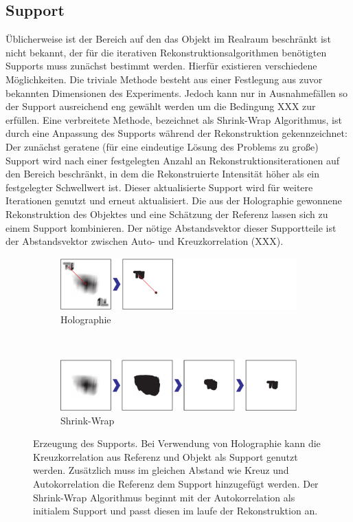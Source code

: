 \subsection{Support}
Üblicherweise ist der Bereich auf den das Objekt im Realraum beschränkt ist nicht bekannt, der für die iterativen Rekonstruktionsalgorithmen benötigten Supports muss zunächst bestimmt werden. Hierfür existieren verschiedene Möglichkeiten. Die triviale Methode besteht aus einer Festlegung aus zuvor bekannten Dimensionen des Experiments. Jedoch kann nur in Ausnahmefällen so der Support ausreichend eng gewählt werden um die Bedingung XXX zur erfüllen.
Eine verbreitete Methode, bezeichnet als Shrink-Wrap Algorithmus, ist durch eine Anpassung des Supports während der Rekonstruktion gekennzeichnet: Der zunächst geratene (für eine eindeutige Lösung des Problems  zu große) Support wird nach einer festgelegten Anzahl an Rekonstruktionsiterationen auf den Bereich beschränkt, in dem die Rekonstruierte Intensität höher als ein festgelegter Schwellwert ist. Dieser aktualisierte Support wird für weitere Iterationen genutzt und erneut aktualisiert\cite{marchesini2003}.
Die aus der Holographie gewonnene Rekonstruktion des Objektes und eine Schätzung der Referenz lassen sich zu einem Support kombinieren. Der nötige Abstandsvektor dieser Supportteile ist der Abstandsvektor zwischen Auto- und Kreuzkorrelation (XXX).

\begin{figure}
	\centering
	\begin{subfigure}[b]{0.9\textwidth}
		\includegraphics[width=\textwidth]{images/support_holo.pdf}
		\caption{Holographie}
	\end{subfigure}\\

	\begin{subfigure}[b]{0.9\textwidth}
		\includegraphics[width=\textwidth]{images/support_sw.pdf}
		\caption{Shrink-Wrap}	
	\end{subfigure}
	
	\caption[Supportgenerierung]{Erzeugung des Supports. Bei Verwendung von Holographie kann die Kreuzkorrelation aus Referenz und Objekt als Support genutzt werden. Zusätzlich muss im gleichen Abstand wie Kreuz und Autokorrelation die Referenz dem Support hinzugefügt werden. Der Shrink-Wrap Algorithmus beginnt mit der Autokorrelation als initialem Support und passt diesen im laufe der Rekonstruktion an.}
	\label{fig:support}
\end{figure} 

